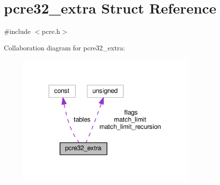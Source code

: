 \hypertarget{structpcre32__extra}{}\section{pcre32\+\_\+extra Struct Reference}
\label{structpcre32__extra}


{\ttfamily \#include $<$pcre.\+h$>$}



Collaboration diagram for pcre32\+\_\+extra\+:
\nopagebreak
\begin{figure}[H]
\begin{center}
\leavevmode
\includegraphics[width=255pt]{structpcre32__extra__coll__graph}
\end{center}
\end{figure}

